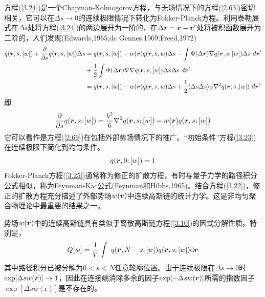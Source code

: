 方程(\ref{3.24})是一个Chapman-Kolmogorov方程，与无场情况下的方程(\ref{2.63})密切相关，它可以在$\Delta s\rightarrow 0$的连续极限情况下转化为Fokker-Planck方程。利用泰勒展式在$\Delta s$处将方程(\ref{3.24})的两边展开为一阶的，在$\Delta\bm{r}=\bm{r}-\bm{r}'$处将被积函数展开为二阶的，人们发现(Edwards,1965;de Gennes,1969;Freed,1972)
\begin{equation}
\begin{aligned}
q(\bm{r},s,[w])+\frac{ \partial}{ \partial s}q(\bm{r},s,[w]) \Delta s&=q(\bm{r},s,[w])-w(\bm{r})q(\bm{r},s,w) \Delta s - \int \Phi( \Delta \bm{r}) \nabla q(\bm{r},s,[w]) \Delta s ~d\bm{r}' \\&+ \frac{1}{2} \int \Phi( \Delta \bm{r}) \nabla \nabla q(\bm{r},s,[w]) \Delta s \Delta s ~d\bm{r}'\\&=q(\bm{r},s,[w])-w(\bm{r})q(\bm{r},s,w) \Delta s + \frac{1}{2} \langle \Delta s \Delta s \rangle _{\Phi} \nabla^2 q(\bm{r},s,[w])   ~d\bm{r}'
\end{aligned}
\end{equation}
即
\begin{equation}\label{3.25}
\frac{\partial}{\partial s}q(\bm{r},s;[w])=\frac{b^2}{6}\nabla^2q(\bm{r},s;[w])-w(\bm{r})q(\bm{r},s;[w])
\end{equation}
它可以看作是方程(\ref{2.69})在包括外部势场情况下的推广。“初始条件”方程(\ref{3.23})在连续极限下简化到均匀条件。
\begin{equation}\label{3.26}
q(\bm{r},0;[w])=1
\end{equation}
Fokker-Planck方程(\ref{3.25})通常称为修正的扩散方程，有时与量子力学的路径积分公式相似，称为Feynman-Kac公式(Feynman和Hibbs,1965)。结合方程(\ref{3.22})，修正的扩散方程充分描述了外部势场$w(\bm{r})$中连续高斯链的统计力学。这是非均匀聚合物理论中最重要的结果之一。

势场$w(\bm{r})$中的连续高斯链具有类似于离散高斯链方程(\ref{3.10})的因式分解性质。特别是，
\begin{equation}\label{3.27}
Q[w]=\frac{1}{V}\int~q(\bm{r},N-s;[w])q(\bm{r},s;[w])\mathrm{d}\bm{r}
\end{equation}
其中路径积分已被分解为$0<s<N$任意轮廓位置。由于连续极限在$\Delta s\rightarrow 0$时$\exp[\Delta sw(\bm{r})]\rightarrow 1$，因此在连接端消除多余的因子$\exp[-\Delta sw(\bm{r})]$所需的指数因子$\exp[\Delta sw(\mathrm{r})]$是不存在的。

